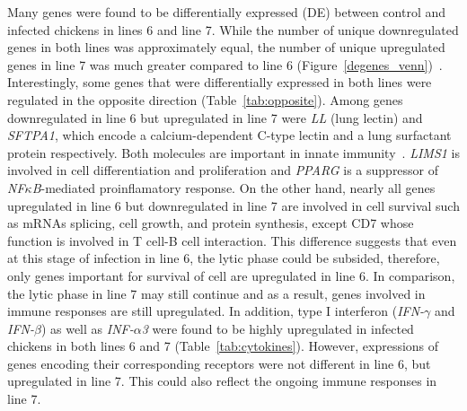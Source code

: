 \documentclass[10pt]{article}
\begin{document}
Many genes were found to be differentially expressed (DE) between control and
infected chickens in lines 6 and line 7.  While the number of unique
downregulated genes in both lines was approximately equal, the number of unique
upregulated genes in line 7 was much greater compared to line 6
(Figure~\ref{degenes_venn})~\cite{lee1983ontogeny}.  Interestingly, some genes
that were differentially expressed in both lines were regulated in the opposite
direction (Table~\ref{tab:opposite}).  Among genes downregulated in line 6 but
upregulated in line 7 were {\em LL} (lung lectin) and {\em SFTPA1}, which encode
a calcium-dependent C-type lectin and a lung surfactant protein respectively.
Both molecules are important in innate
immunity~\cite{hogenkamp2008chicken,kingma2006defense}.  {\em LIMS1} is involved
in cell differentiation and proliferation and {\em PPARG} is a suppressor of
{\em NF$\kappa$B}-mediated proinflamatory response.  On the other hand, nearly
all genes upregulated in line 6 but downregulated in line 7 are involved in cell
survival such as mRNAs splicing, cell growth, and protein synthesis, except CD7
whose function is involved in T cell-B cell interaction.  This difference
suggests that even at this stage of infection in line 6, the lytic phase could
be subsided, therefore, only genes important for survival of cell are
upregulated in line 6.  In comparison, the lytic phase in line 7 may still
continue and as a result, genes involved in immune responses are still
upregulated.  In addition, type I interferon ({\em IFN-$\gamma$} and {\em
IFN-$\beta$}) as well as {\em INF-$\alpha$3} were found to be highly upregulated
in infected chickens in both lines 6 and 7 (Table~\ref{tab:cytokines}).
However, expressions of genes encoding their corresponding receptors were not
different in line 6, but upregulated in line 7.  This could also reflect the
ongoing immune responses in line 7.
\end{document}
